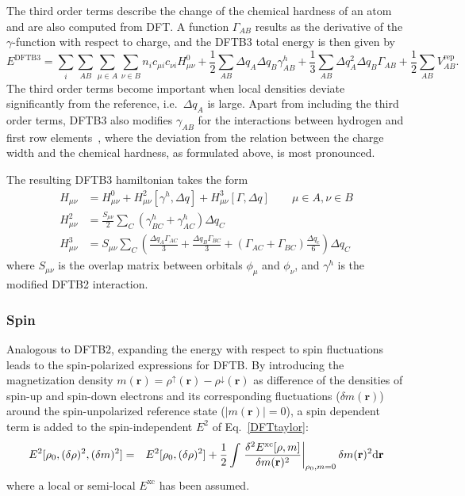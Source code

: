 \documentclass[reprint,onecolumn,superscriptaddress]{revtex4-1}
\begin{document}
The third order terms describe the change of the chemical hardness of an atom
and are also computed from DFT. A function $\Gamma_{AB}$ results as the
derivative of the $\gamma$-function with respect to charge, and the DFTB3 total
energy is then given by
\begin{equation}
  E^{\text{DFTB3}} = \sum_i \sum_{AB}\sum_{\mu\in A}\sum_{\nu\in B} n_i c_{\mu i}
  c_{\nu i} H^0_{\mu\nu} + \frac{1}{2}\sum_{AB} \Delta q_A \Delta
  q_B\gamma_{AB}^h
  + \frac{1}{3}\sum_{AB} \Delta q_A^2 \Delta q_B\Gamma_{AB} +
  \frac{1}{2}\sum_{AB}V^{\text{rep}}_{AB}.
  \label{eq:etot}
\end{equation}
%
The third order terms become important when local densities deviate
significantly from the reference, i.e.\ $\Delta q_A$ is large. Apart from
including the third order terms, DFTB3 also modifies $\gamma_{AB}$ for the
interactions between hydrogen and first row elements~\cite{Elstner2007}, where
the deviation from the relation between the charge width and the chemical
hardness, as formulated above, is most pronounced.

The resulting DFTB3 hamiltonian takes the form
\begin{align}
H_{\mu\nu} &= H^0_{\mu\nu} + H^2_{\mu\nu}[\gamma^h,\Delta q] + H^3_{\mu\nu}[\Gamma,\Delta q] \qquad{\mu \in A, \nu \in B} \label{dftb3Ham}\\
H^2_{\mu\nu} &= \frac{S_{\mu\nu}}{2} \sum\limits_C \left( \gamma^h_{BC} + \gamma^h_{AC} \right) \Delta q_C\\
H^3_{\mu\nu} &= S_{\mu\nu} \sum\limits_C \left( \frac{\Delta q_A \Gamma_{AC}}{3} + \frac{\Delta q_B
\Gamma_{BC}}{3} + \left( \Gamma_{AC} + \Gamma_{BC}
\right) \frac{\Delta q_c}{6} \right) \Delta q_C
\end{align}
where $S_{\mu\nu}$ is the overlap matrix between orbitals $\phi_\mu$ and
$\phi_\nu$, and $\gamma^h$ is the modified DFTB2 interaction.

\subsubsection{Spin}

Analogous to DFTB2, expanding the energy with respect to spin
fluctuations~\cite{Frauenheim2000, Koehler2005, Koehler2001} leads to the
spin-polarized expressions for DFTB. By introducing the magnetization density
$m(\mathbf{r})=\rho^{\uparrow}(\mathbf{r})-\rho^{\downarrow}(\mathbf{r})$ as
difference of the densities of spin-up and spin-down electrons and its
corresponding fluctuations ($\delta m(\mathbf{r})$) around the spin-unpolarized
reference state ($|m(\mathbf{r})|=0$), a spin dependent term is added to the
spin-independent $E^2$ of Eq.~\eqref{DFTtaylor}:
\begin{eqnarray}
E^2[\rho_0,(\delta \rho)^2,(\delta m)^2]
  &=& E^2[\rho_0,(\delta \rho)^2] 
  +\frac{1}{2}\int 
  \eval{\frac{\delta^2E^{\text{xc}}[\rho,m]}{\delta m(\mathbf{r})^2}}_{\rho_0,m=0}\delta m(\mathbf{r})^2\mathrm{d}\mathbf{r} \label{spin1}
\end{eqnarray}
where a local or semi-local $E^{\text{xc}}$ has been assumed.
\end{document}
